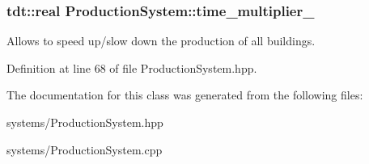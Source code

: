 \subsubsection[{\texorpdfstring{time\+\_\+multiplier\+\_\+}{time_multiplier_}}]{\setlength{\rightskip}{0pt plus 5cm}tdt\+::real Production\+System\+::time\+\_\+multiplier\+\_\+\hspace{0.3cm}{\ttfamily [private]}}\hypertarget{class_production_system_a0d1e37301b0549aa967c561c6f8f876e}{}\label{class_production_system_a0d1e37301b0549aa967c561c6f8f876e}


Allows to speed up/slow down the production of all buildings. 



Definition at line 68 of file Production\+System.\+hpp.



The documentation for this class was generated from the following files\+:\begin{DoxyCompactItemize}
\item 
systems/Production\+System.\+hpp\item 
systems/Production\+System.\+cpp\end{DoxyCompactItemize}
